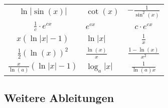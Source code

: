 \begin{center}
\begin{tabularx}{\linewidth}{c>{\centering\arraybackslash}Xc}
    $\ln | \sin(x)|$                       & $\cot(x)$                & $-\frac{1}{\sin^2(x)}$         \\
    $\frac{1}{c} \cdot e^{cx}$             & $e^{cx}$                 & $c \cdot e^{cx}$               \\
    $x(\ln |x| - 1)$                       & $\ln |x|$                & $\frac{1}{x}$                  \\
    $\frac{1}{2}(\ln(x))^2$                & $\frac{\ln(x)}{x}$       & $\frac{1 - \ln(x)}{x^2}$       \\
    $\frac{x}{\ln(a)} (\ln|x| -1)$         & $\log_a |x|$             & $\frac{1}{\ln(a)x}$            \\
    \bottomrule
  \end{tabularx}
\end{center}
\subsection{Weitere Ableitungen}

